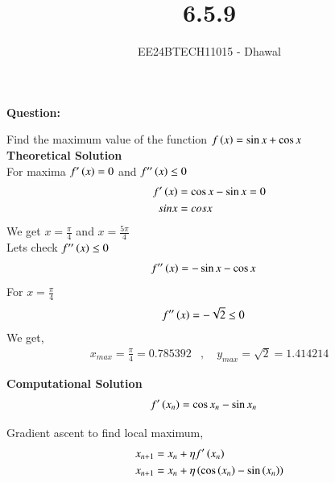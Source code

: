 \documentclass[journal]{IEEEtran}
\begin{document}

\vspace{3cm}

\title{6.5.9}
\author{EE24BTECH11015 - Dhawal}

{\let\newpage\relax\maketitle}

\renewcommand{\thefigure}{\theenumi}
\renewcommand{\thetable}{\theenumi}
\setlength{\intextsep}{10pt} %

\textbf{Question:}

Find the maximum value of the function $f\left(x\right)=\sin x +\cos x$
\\

\textbf{Theoretical Solution}\\
For maxima $f^\prime\left(x\right)=0$ and $f^{\prime\prime}\left(x\right) \leq 0$
\begin{align}
    f^\prime\left(x\right) &= \cos x -\sin x =0\\
    sinx&=cosx
\end{align}
We get $x=\frac{\pi}{4}$ and $x=\frac{5\pi}{4}$\\
Lets check $f^{\prime\prime}\left(x\right) \leq 0$\\
\begin{align}
    f^{\prime\prime}\left(x\right) &= -\sin x -\cos x 
\end{align}
For $x=\frac{\pi}{4}$\\
\begin{align}
    f^{\prime\prime}\left(x\right) &= -\sqrt{2} \leq 0
\end{align}
We get,
\begin{align}
    x_{max} = \frac{\pi}{4}=0.785392&,\quad y_{max} =\sqrt{2}= 1.414214
\end{align}

\textbf{Computational Solution}
\begin{align}
    f^\prime\left(x_{n}\right) &= \cos x_n -\sin x_n
\end{align}

Gradient ascent to find local maximum,
\begin{align}
    x_{n+1} &= x_{n} + \eta f^\prime\left(x_{n}\right) \\
	x_{n+1} &= x_{n} + \eta \left(\cos{\ensuremath{\left(x_{n}\right)}}-\sin{\ensuremath{\left(x_n\right)}}\right)
\end{align}
\end{document}
